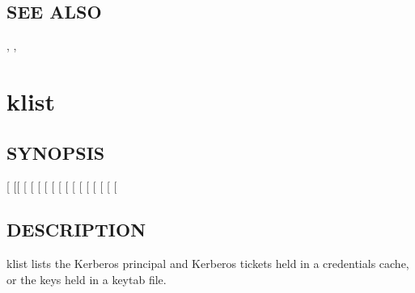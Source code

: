 \documentclass[letterpaper,10pt,english]{sphinxmanual}
\begin{document}
\subsection{SEE ALSO}
\label{\detokenize{user/user_commands/kinit:see-also}}
{\hyperref[\detokenize{user/user_commands/klist:klist-1}]{}}, {\hyperref[\detokenize{user/user_commands/kdestroy:kdestroy-1}]{}}, {\hyperref[\detokenize{user/user_config/kerberos:kerberos-7}]{}}


\section{klist}
\label{\detokenize{user/user_commands/klist:klist}}\label{\detokenize{user/user_commands/klist::doc}}\label{\detokenize{user/user_commands/klist:klist-1}}

\subsection{SYNOPSIS}
\label{\detokenize{user/user_commands/klist:synopsis}}
{[}\sphinxstylestrong{-e}{]}
{[}{[}\sphinxstylestrong{-c}{]} {[}\sphinxstylestrong{-l}{]} {[}\sphinxstylestrong{-A}{]} {[}\sphinxstylestrong{-f}{]} {[}\sphinxstylestrong{-s}{]} {[} {[}\sphinxstylestrong{-n}{]}{]}{]}
{[}\sphinxstylestrong{-C}{]}
{[} {[}\sphinxstylestrong{-i}{]} {[}\sphinxstylestrong{-t}{]} {[}\sphinxstylestrong{-K}{]}{]}
{[}\sphinxstylestrong{-V}{]}
{[}\sphinxstylestrong{-d}{]}
{[}\textbar{}\sphinxstyleemphasis{keytab\_name}{]}


\subsection{DESCRIPTION}
\label{\detokenize{user/user_commands/klist:description}}
klist lists the Kerberos principal and Kerberos tickets held in a
credentials cache, or the keys held in a keytab file.
\end{document}
